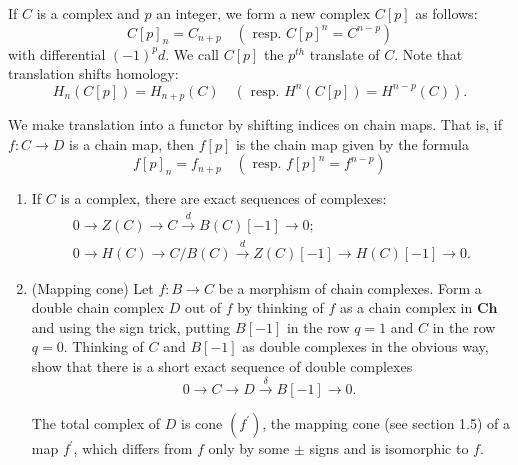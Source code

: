 If $C$ is a complex and $p$ an integer, we form a new complex $C[p]$ as follows:
$$
C[p]_n=C_{n+p} \quad\left(\text { resp. } C[p]^n=C^{n-p}\right)
$$
with differential $(-1)^p d$. We call $C[p]$ the $p^{t h}$ translate of $C$. Note that translation shifts homology:
$$
H_n(C[p])=H_{n+p}(C) \quad\left(\text { resp. } H^n(C[p])=H^{n-p}(C)\right) .
$$

We make translation into a functor by shifting indices on chain maps. That is, if $f: C \rightarrow D$ is a chain map, then $f[p]$ is the chain map given by the formula
$$
f[p]_n=f_{n+p} \quad\left(\text { resp. } f[p]^n=f^{n-p}\right)
$$ 

\begin{prop}
    \begin{enumerate}
        \item If $C$ is a complex, there are exact sequences of complexes:
        $$
        \begin{gathered}
        0 \longrightarrow Z(C) \longrightarrow C \xrightarrow{d} B(C)[-1] \longrightarrow 0 ; \\
        0 \longrightarrow H(C) \longrightarrow C / B(C) \xrightarrow{d} Z(C)[-1] \longrightarrow H(C)[-1] \longrightarrow 0 .
        \end{gathered}
        $$
        
        \item (Mapping cone) Let $f: B \rightarrow C$ be a morphism of chain complexes. Form a double chain complex $D$ out of $f$ by thinking of $f$ as a chain complex in $\mathbf{C h}$ and using the sign trick, putting $B[-1]$ in the row $q=1$ and $C$ in the row $q=0$. Thinking of $C$ and $B[-1]$ as double complexes in the obvious way, show that there is a short exact sequence of double complexes
        $$
        0 \longrightarrow C \longrightarrow D \xrightarrow{\delta} B[-1] \longrightarrow 0 \text {. }
        $$
        
        The total complex of $D$ is cone $\left(f^{\prime}\right)$, the mapping cone (see section 1.5) of a map $f^{\prime}$, which differs from $f$ only by some $\pm$ signs and is isomorphic to $f$.
    \end{enumerate}
\end{prop}



